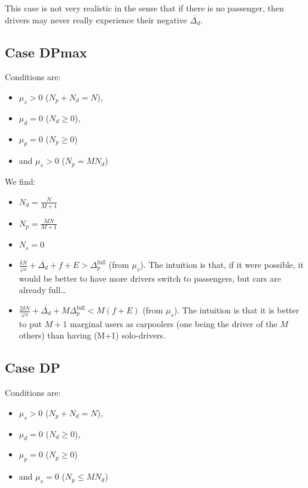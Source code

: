 \documentclass[english, a4paper]{article}
\theoremstyle{plain}
\theoremstyle{definition}
\theoremstyle{remark}
\begin{document}
This case is not very realistic in the sense that if there is no passenger, then drivers may never really experience their negative $\overline{\Delta_d}$.

\subsection{Case DPmax}
Conditions are: \begin{itemize}
    \item $\mu_s > 0$ ($N_p + N_d = N$),
    \item $\mu_d = 0$ ($N_d \geq 0$),
    \item $\mu_p = 0$ ($N_p \geq 0$)
    \item and $\mu_v > 0$ ($N_p = MN_d$)
\end{itemize}

We find:
\begin{itemize}
    \item $N_d = \frac{N}{M+1}$
    \item $N_p = \frac{MN}{M+1}$
    \item $N_s = 0$
    \item $\frac{\delta N}{\varphi s} + \overline{\Delta_d} + f + E > \Delta_p^{\text{full}}$ (from $\mu_v$). The intuition is that, if it were possible, it would be better to have more drivers switch to passengers, but cars are already full…
    \item $\frac{2\delta N}{\varphi s} + \overline{\Delta_d} + M\Delta_p^{\text{full}} < M(f + E)$ (from $\mu_s$). The intuition is that it is better to put $M+1$ marginal users as carpoolers (one being the driver of the $M$ others) than having (M+1) solo-drivers.
\end{itemize}

\subsection{Case DP}

Conditions are:
\begin{itemize}
    \item $\mu_s > 0$ ($N_p + N_d = N$),
    \item $\mu_d = 0$ ($N_d \geq 0$),
    \item $\mu_p = 0$ ($N_p \geq 0$)
    \item and $\mu_v = 0$ ($N_p \leq MN_d$)
\end{itemize}
\end{document}
